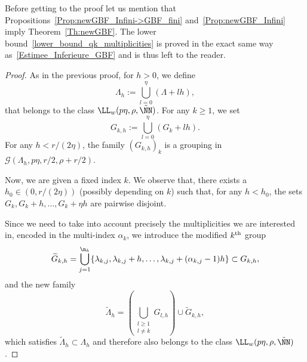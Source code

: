 Before getting to the proof let us mention that Propositions~\ref{Prop:newGBF_Infini->GBF_fini} and~\ref{Prop:newGBF_Infini} imply Theorem~\ref{Th:newGBF}. The lower bound~\eqref{lower_bound_qk_multiplicities} is proved in the exact same way as~\eqref{Estimee_Inferieure_GBF} and is thus left to the reader.
\begin{proof}
As in the previous proof, for $h>0$, we define
\[
\Lambda_h :=\bigcup_{l=0}^{\eta} (\Lambda + l h),
\]
that belongs to the class $\LL_w(p\eta,\rho,\tilde{\NN})$. For any $k \geq 1$, we set
\[
G_{k,h} := \bigcup_{l=0}^{\eta} (G_k + l h).
\]
For any $h<r/(2\eta)$, the family $(G_{k,h})_k$ is a grouping in $\mathcal{G}(\Lambda_h, p\eta,r/2,\rho+r/2)$.

Now, we are given a fixed index $k$. We observe that, there exists a $h_0\in(0,r/(2\eta))$ (possibly depending on $k$) such that, for any $h<h_0$, the sets $G_k, G_k+h, \dotsc, G_k+\eta h$ are pairwise disjoint.

Since we need to take into account precisely the multiplicities we are interested in, encoded in the multi-index $\alpha_k$, we introduce the modified $k^{\rm th}$ group
\goodbreak
\begingroup
\[
\widetilde{G}_{k,h} = \bigcup_{j=1}^{\n_k} \{\lambda_{k,j}, \lambda_{k,j} +h, \dotsc,\lambda_{k,j}+(\alpha_{k,j}-1) h \} \subset G_{k,h},
\]
and the new family
\[
\tilde{\Lambda}_h = \left(\bigcup_{\substack{l\geq 1\\l\neq k}} G_{l,h} \right) \cup \widetilde{G}_{k,h},
\]
\endgroup
which satisfies $\tilde{\Lambda}_h\subset \Lambda_h$ and therefore also belongs to the class $\LL_w(p\eta,\rho,\tilde{\NN})$.


\end{proof}
